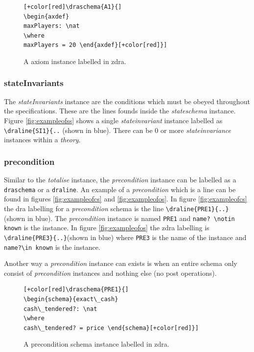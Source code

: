 \begin{figure}[H]
\centering
\begin{footnotesize}
\begin{BVerbatim}[commandchars=+\[\]]
[+color[red]\draschema{A1}{]
\begin{axdef}
maxPlayers: \nat
\where
maxPlayers = 20 \end{axdef}[+color[red]}]
\end{BVerbatim}
\end{footnotesize}
\caption{\label{fig:exampleofa} A axiom instance labelled in \gls{zdra}.}
\end{figure}

\subsubsection{stateInvariants}
The \emph{stateInvariants} instance are the conditions which must be obeyed
throughout the specifications. These are the lines founds inside the
\emph{stateschema} instance. Figure \ref{fig:exampleofss} shows a single
\emph{stateinvariant} instance labelled as \verb|\draline{SI1}{..| (shown in
blue). There can be 0 or more \emph{stateinvariance} instances within a
\emph{theory}.

\subsubsection{precondition}

Similar to the \emph{totalise} instance, the \emph{precondition} instance can be
labelled as a \verb|draschema| or a \verb|draline|. An example of a
\emph{precondition} which is a line can be found in figures
\ref{fig:exampleofcs} and \ref{fig:exampleofos}. In figure \ref{fig:exampleofcs}
the \gls{dra} labelling for a \emph{precondition} schema is the line
\verb|\draline{PRE1}{..}| (shown in blue). The \emph{precondition} instance is
named \verb|PRE1| and \verb|name? \notin known| is the instance. In figure
\ref{fig:exampleofos} the \gls{zdra} labelling is 
\verb|\draline{PRE3}{..}|(shown in blue) where \verb|PRE3| is the name of the
instance and 
\verb|name?\in known| is the instance.

Another way a \emph{precondition} instance can exists is when an entire schema
only consist of \emph{precondition} instances and nothing else (no post
operations).

\begin{figure}[H]
\centering
\begin{footnotesize}
\begin{BVerbatim}[commandchars=+\[\]]
[+color[red]\draschema{PRE1}{]
\begin{schema}{exact\_cash}
cash\_tendered?: \nat
\where
cash\_tendered? = price \end{schema}[+color[red]}]
\end{BVerbatim}
\end{footnotesize}
\caption{\label{fig:exampleofpre} A precondition schema instance labelled in \gls{zdra}.}
\end{figure}

